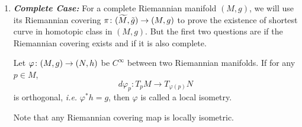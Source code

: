 \begin{enumerate}[label=\arabic{*}.]
\begin{proof}[Proof of Lemma \ref{lem:homolift}]
\begin{enumerate}[label=\Roman*.]
			\item Global Lifting: By above, for any $p \in P$, there is a $V_p$ such that $\widetilde{F}_p \defeq \widetilde{F}_{V_p}$ is a lifting of $F|_{V_p \times I}$ satisfying $(\widetilde{F}_p)|_{V_p \times \bb{0}} = \widetilde{F}_0|_{V_p}$. Because $\bb{V_p}_{p \in P}$ is an open covering, we define $\tilde{F} \colon P \times I \sto \tilde{X}$ by
			\begin{equation*}
				\widetilde{F}|_{V_p \times I}=\widetilde{F}_p
			\end{equation*}
			which is well-defined and continuous and the uniqueness is by the uniqueness of $\widetilde{F}_p$. \qedhere
		\end{enumerate}
	\end{proof}

	\item \emph{\textbf{Complete Case:}} For a complete Riemannian manifold $(M,g)$, we will use its Riemannian covering $\pi \colon (\widetilde{M},\tilde{g}) \rightarrow (M,g)$ to prove the existence of shortest curve in homotopic class in $(M,g)$. But the first two questions are if the Riemannian covering exists and if it is also complete.

	\begin{defn}
		Let $\varphi \colon (M,g) \rightarrow (N,h)$ be $C^\infty$ between two Riemannian manifolds. If for any $p \in M$,
		\begin{equation*}
			d\varphi_p \colon T_pM \longrightarrow T_{\varphi(p)}N
		\end{equation*}
		is orthogonal, \emph{i.e.} $\varphi^*h = g$, then $\varphi$ is called a local isometry.
	\end{defn}
	Note that any Riemannian covering map is locally isometric.


\end{enumerate}
